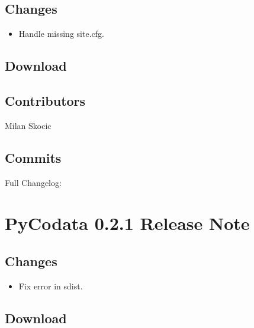 \documentclass[a4paper,10pt,english]{sphinxmanual}
\begin{document}
\subsection{Changes}
\label{\detokenize{releases/0.2.2-notes:changes}}\begin{itemize}
\item {} 
\sphinxAtStartPar
Handle missing site.cfg.

\end{itemize}


\subsection{Download}
\label{\detokenize{releases/0.2.2-notes:download}}
\sphinxAtStartPar
{}


\subsection{Contributors}
\label{\detokenize{releases/0.2.2-notes:contributors}}
\sphinxAtStartPar
Milan Skocic


\subsection{Commits}
\label{\detokenize{releases/0.2.2-notes:commits}}
\sphinxAtStartPar
Full Changelog: 

\sphinxstepscope


\section{PyCodata 0.2.1 Release Note}
\label{\detokenize{releases/0.2.1-notes:pycodata-0-2-1-release-note}}\label{\detokenize{releases/0.2.1-notes::doc}}

\subsection{Changes}
\label{\detokenize{releases/0.2.1-notes:changes}}\begin{itemize}
\item {} 
\sphinxAtStartPar
Fix error in sdist.

\end{itemize}


\subsection{Download}
\label{\detokenize{releases/0.2.1-notes:download}}
\sphinxAtStartPar
{}
\end{document}
